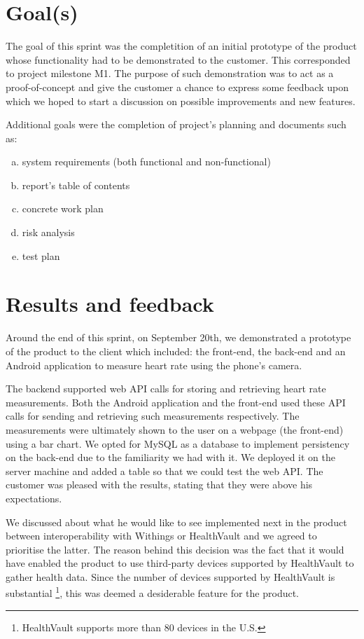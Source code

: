 \section{Goal(s)}

The goal of this sprint was the completition of an initial prototype of the product whose functionality had to be demonstrated to the customer.
This corresponded to project milestone M1.
The purpose of such demonstration was to act as a proof-of-concept and give the customer a chance to express some feedback upon which we hoped to start a discussion on possible improvements and new features.

Additional goals were the completion of project's planning and documents such as:
\begin{enumerate}[a)]
\item system requirements (both functional and non-functional)
\item report's table of contents
\item concrete work plan
\item risk analysis
\item test plan
\end{enumerate}


\section{Results and feedback}

Around the end of this sprint, on September 20th, we demonstrated a prototype of the product to
the client which included: the front-end, the back-end and an Android application to measure heart rate using the phone's camera.

The backend supported web API calls for storing and retrieving heart rate measurements.
Both the Android application and the front-end used these API calls for sending and retrieving such measurements respectively.
The measurements were ultimately shown to the user on a webpage (the front-end) using a bar chart.
We opted for MySQL as a database to implement persistency on the back-end due to the familiarity we had with it. 
We deployed it on the server machine and added a table so that we could test the web API.
The customer was pleased with the results, stating that they were above his expectations.

We discussed about what he would like to see implemented next in the product between interoperability
with Withings or HealthVault and we agreed to prioritise the latter.
The reason behind this decision was the fact that it would have enabled the product to use third-party
devices supported by HealthVault to gather health data.
Since the number of devices supported by HealthVault is substantial \footnote{HealthVault supports more
than 80 devices in the U.S.}, this was deemed a desiderable feature for the product.


